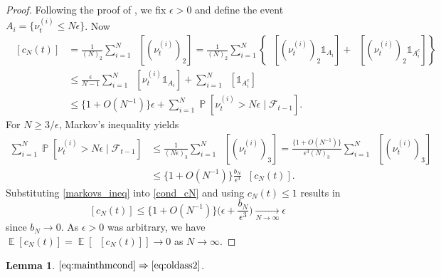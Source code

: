 \documentclass{article} %
\newtheorem{lemma}{Lemma}
\theoremstyle{definition}
\DeclareMathOperator{\Prob}{\mathbb{P}}
\DeclareMathOperator{\E}{\mathbb{E}}
\DeclareMathOperator{\Et}{\mathbb{E}_t}
\newcommand{\1}[1]{\mathbbm{1}_{\{#1\}}}
\begin{document}
\begin{proof}
Following the proof of \cite[Lemma 5.5]{mohle2003}, we fix $\epsilon > 0$ and define the event $A_i = \{ \nu_t^{(i)} \leq N \epsilon \}$.
Now
\begin{align}
\Et[ c_N( t ) ] &= \frac{ 1 }{ ( N )_2 } \sum_{ i = 1 }^N \Et\left[ ( \nu_t^{(i)} )_2 \right] 
= \frac{ 1 }{ ( N )_2 } \sum_{ i = 1 }^N \left\{ \Et\left[ ( \nu_t^{(i)} )_2 \mathds{ 1 }_{ A_i } \right] + \Et\left[ ( \nu_t^{(i)} )_2 \mathds{ 1 }_{ A_i^c } \right] \right\} \nonumber \\
&\leq \frac{ \epsilon }{ N - 1 } \sum_{ i = 1 }^N \Et\left[ \nu_t^{(i)} \mathds{ 1 }_{ A_i } \right] + \sum_{ i = 1 }^N \Et\left[ \mathds{ 1 }_{ A_i^c } \right] \nonumber \\
&\leq \{ 1 + O( N^{ -1 } ) \} \epsilon + \sum_{ i = 1 }^N \Prob\left[ \nu_t^{(i)} > N \epsilon \mid \mathcal{F}_{t-1} \right]. \label{cond_cN}
\end{align}
For $N \geq 3 / \epsilon$, Markov's inequality yields
\begin{align}
\sum_{ i = 1 }^N \Prob\left[ \nu_t^{(i)} > N \epsilon \mid \mathcal{F}_{t-1} \right] &\leq \frac{ 1 }{ ( N \epsilon )_3 } \sum_{ i = 1 }^N \Et\left[ ( \nu_t^{(i)} )_3\right] = \frac{ \{ 1 + O( N^{ -1 } ) \} }{ \epsilon^3 ( N )_3 } \sum_{ i = 1 }^N \Et\left[ ( \nu_t^{(i)} )_3 \right] \nonumber \\
&\leq \{ 1 + O( N^{ -1 } ) \} \frac{ b_N }{ \epsilon^3 } \Et[ c_N( t ) ]. \label{markovs_ineq}
\end{align}
Substituting \eqref{markovs_ineq} into \eqref{cond_cN} and using $c_N( t ) \leq 1$ results in
\begin{equation*}
\Et[ c_N( t ) ] \leq \{ 1 + O( N^{ -1 } ) \} \Bigg( \epsilon + \frac{ b_N }{ \epsilon^3 } \Bigg) \underset{N\to\infty}{\longrightarrow} \epsilon
\end{equation*}
since $b_N \rightarrow 0$. 
As $\epsilon > 0$ was arbitrary, we have
$
\E[ c_N( t ) ] = \E\left[ \Et[ c_N( t ) ] \right ] \rightarrow 0
$
as $N \rightarrow \infty$.
\end{proof}

\begin{lemma} \label{lem:removeass2}
$\eqref{eq:mainthmcond} \Rightarrow \eqref{eq:oldass2}$.
\end{lemma}
\end{document}
